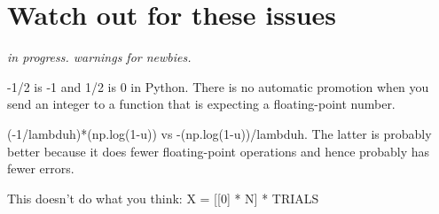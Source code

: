 \chapter{Watch out for these issues}

\begin{fullwidth}
{\em in progress.  warnings for newbies.}

-1/2 is -1 and 1/2 is 0 in Python.  There is no automatic promotion when you send an integer to a function that is expecting a floating-point number.

(-1/lambduh)*(np.log(1-u)) vs -(np.log(1-u))/lambduh. The latter is probably better because it does fewer floating-point operations and hence probably has fewer errors.

This doesn't do what you think: X = [[0] * N] * TRIALS

\end{fullwidth}

